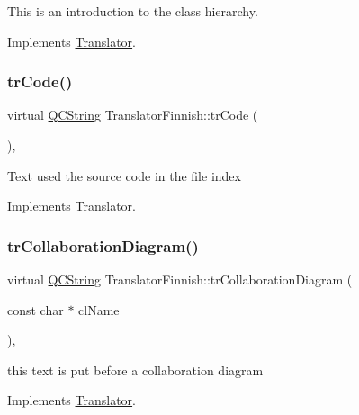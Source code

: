 This is an introduction to the class hierarchy. 

Implements \mbox{\hyperlink{class_translator}{Translator}}.

\mbox{\label{class_translator_finnish_a8111c1739afc8f2ae411b77cfe56f2b0}} 
\subsubsection{\texorpdfstring{trCode()}{trCode()}}
{\footnotesize\ttfamily virtual \mbox{\hyperlink{class_q_c_string}{Q\+C\+String}} Translator\+Finnish\+::tr\+Code (\begin{DoxyParamCaption}{ }\end{DoxyParamCaption})\hspace{0.3cm}{\ttfamily [inline]}, {\ttfamily [virtual]}}

Text used the source code in the file index 

Implements \mbox{\hyperlink{class_translator}{Translator}}.

\mbox{\label{class_translator_finnish_a1ddca306102316e97620b307ff41c05e}} 
\subsubsection{\texorpdfstring{trCollaborationDiagram()}{trCollaborationDiagram()}}
{\footnotesize\ttfamily virtual \mbox{\hyperlink{class_q_c_string}{Q\+C\+String}} Translator\+Finnish\+::tr\+Collaboration\+Diagram (\begin{DoxyParamCaption}\item[{const char $\ast$}]{cl\+Name }\end{DoxyParamCaption})\hspace{0.3cm}{\ttfamily [inline]}, {\ttfamily [virtual]}}

this text is put before a collaboration diagram 

Implements \mbox{\hyperlink{class_translator}{Translator}}.

\mbox{\label{class_translator_finnish_ad483274255d1ff1a3d88fc1b4b1be38e}} 
